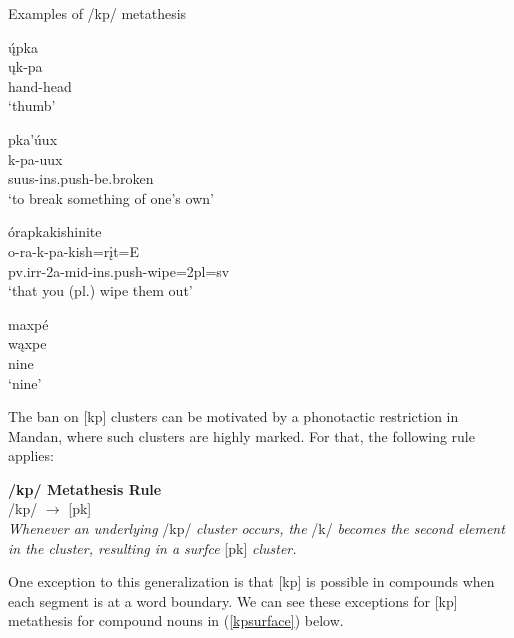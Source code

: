 \begin{exe}
\item\label{kpmetaex1} Examples of /kp/ metathesis
	\begin{xlist}
	\item\label{kpmetaex1a}
	\glll ų́pka\\
	ųk-pa\\
	\textnormal{hand}-\textnormal{head}\\
	\glt `thumb' \citep[35]{hollow1970}
	\item\label{kpmetaex1b}
	\glll pka'úux\\
	k-pa-uux\\
	suus-ins.push-\textnormal{be.broken}\\
	\glt `to break something of one's own' \citep[263]{hollow1970}
	\item\label{kpmetaex1c}
	\glll órapkakishinite\\
	o-ra-k-pa-kish=rįt=E\\
	pv.irr-2a-mid-ins.push-\textnormal{wipe}=2pl=sv\\
	\glt `that you (pl.) wipe them out'	 \citep[210]{trechter2012b}
	\item\label{kpmetaex1d}
	\glll maxpé\\
	wąxpe\\
	\textnormal{nine}\\
	\glt `nine' \citep[21]{hollow1976}
	\end{xlist}
\end{exe}

The ban on [kp] clusters can be motivated by a phonotactic restriction in Mandan, where such clusters are highly marked. For that, the following rule applies:

\begin{exe}

\item\label{KPmetathesizeRule} \textbf{/kp/ Metathesis Rule}\\
	/kp/ $\to$ [pk]\\
	\textit{Whenever an underlying} /kp/ \textit{cluster occurs, the} /k/ \textit{becomes the second element in the cluster, resulting in a surfce} [pk] \textit{cluster.}

\end{exe}

One exception to this generalization is that [kp] is possible in compounds when each segment is at a word boundary. We can see these exceptions for [kp] metathesis for compound nouns in (\ref{kpsurface}) below.



